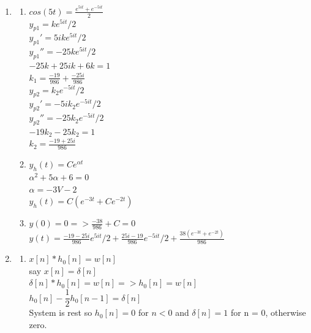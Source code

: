 \documentclass[10pt,a4paper, margin=1in]{article}
\begin{document}
\begin{enumerate}
\item %
    \begin{enumerate}
    \item 
    $cos(5t) = \frac{e^{5it} + e^{-5it}}{2}$\\
    $y_{p1} = ke^{5it}/2$\\
    $y_{p1}' = 5ike^{5it}/2$\\
    $y_{p1}'' = -25ke^{5it}/2$\\
    $-25k+25ik+6k = 1$\\
    $k_1=\frac{-19}{986} + \frac{-25i}{986}$\\
    $y_{p2} = k_2e^{-5it}/2$\\
    $y_{p2}' = -5i k_2e^{-5it}/2$\\
    $y_{p2}'' = -25k_2e^{-5it}/2$\\
    $-19k_2 - 25k_2 = 1$\\
    $k_2 = \frac{-19 +25i}{986}$\\
    \item %
    $y_h(t) = Ce^{\alpha t}$\\
    $\alpha^2 + 5\alpha+6=0$\\
    $\alpha = -3 V -2$\\
    $y_h(t) = C(e^{-3t} + Ce^{-2t})$\\
	\item %
	$y(0) = 0 => \frac{-38}{986} + C = 0 $\\
    $y(t) = \frac{-19 - 25i}{986}e^{5it}/2 + \frac{25i-19}{986}e^{-5it}/2 + \frac{38(e^{-3t} + e^{-2t})}{986}$\\
    \end{enumerate}    
    
\item %
    \begin{enumerate}
    \item %
    $x[n] * h_0[n] = w[n]$ \\

    say $x[n] = \delta[n]$\\

    $\delta[n] * h_0[n] = w[n] => h_0[n] = w[n]$ \\

    $h_0[n] - \dfrac{1}{2}h_0[n-1] = \delta[n]$ \\

    System is rest so $h_0[n] = 0$ for $n < 0$ and $\delta[n] = 1$ for n = 0, otherwise zero.


\end{enumerate}
\end{enumerate}
\end{document}
